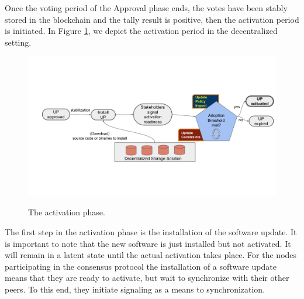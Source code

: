Once the voting period of the Approval phase ends, the votes have been stably stored in the blockchain and the tally result is positive, then the activation period is initiated. In Figure \ref{activation}, we depict the activation period in the decentralized setting.
\begin{figure}[h!] %
    \caption{The activation phase.}
    \centering
    \includegraphics[width=1.0 \columnwidth,keepaspectratio]{figures/activation_phase.pdf}
    \label{activation}
\end{figure}
The first step in the activation phase is the installation of the software update. It is important to note that the new software is just installed but not activated. It will remain in a latent state until the actual activation takes place. For the nodes participating in the consensus protocol the installation of a software update means that they are ready to activate, but wait to synchronize with their other peers. To this end, they initiate signaling as a means to synchronization. %

